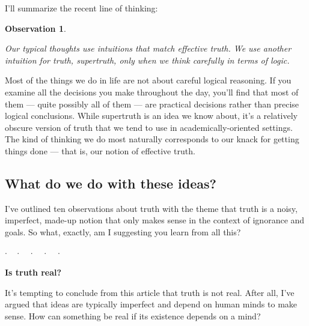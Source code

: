 \documentclass[11pt, oneside]{article}
\newtheorem{obs}{Observation}
\theoremstyle{argtstyle}
\newcommand{\dotq}{\cdot\quad}
\newcommand{\scenebreak}{
    \medskip\centerline{$\dotq\dotq\dotq\dotq\cdot$}\medskip
}
\begin{document}
I'll summarize the recent line of thinking:
\newcommand{\obsten}{
    Our typical thoughts use intuitions that match effective truth.
    We use another intuition for truth, supertruth, only when we think
    carefully in terms of logic.
}
\begin{obs}\label{o10}
    \obsten
\end{obs}
Most of the things we do in life are not about careful logical reasoning. If you
examine all the decisions you make throughout
the day, you'll find that most of them --- quite possibly all of them --- 
are practical decisions rather than precise logical conclusions.
While supertruth is an idea we know
about, it's a relatively obscure version of truth that we tend to use
in academically-oriented settings.
The kind of thinking we do most naturally corresponds to our knack for
getting things done --- that is, our notion of effective truth.


\subsection{What do we do with these ideas?}

I've outlined ten observations about truth with the theme that
truth is a noisy, imperfect, made-up notion that only makes sense in the context
of ignorance and goals. So what, exactly, am I suggesting you learn from
all this?

\scenebreak

\noindent
{\bf Is truth real?}

It's tempting to conclude from this article that truth is not real.
After all, I've argued that ideas are typically imperfect and depend on
human minds to make sense. How can something be real if its existence depends on
a mind?
\end{document}
